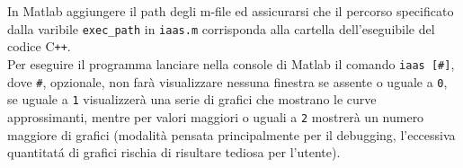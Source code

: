 \documentclass[12pt]{report}
\begin{document}
\noindent In Matlab aggiungere il path degli m-file ed assicurarsi che il percorso specificato dalla varibile \verb|exec_path| in \verb|iaas.m| corrisponda alla cartella dell'eseguibile del codice C\verb|++|.\\
Per eseguire il programma lanciare nella console di Matlab il comando \verb|iaas [#]|, dove \verb|#|, opzionale, non far\`a visualizzare nessuna finestra se assente o uguale a \verb|0|, se uguale a \verb|1| visualizzer\`a una serie di grafici che mostrano le curve approssimanti, mentre per valori maggiori o uguali a \verb|2| mostrer\`a un numero maggiore di grafici (modalit\`a pensata principalmente per il debugging, l'eccessiva quantitat\'a di grafici rischia di risultare tediosa per l'utente).

\end{document}
